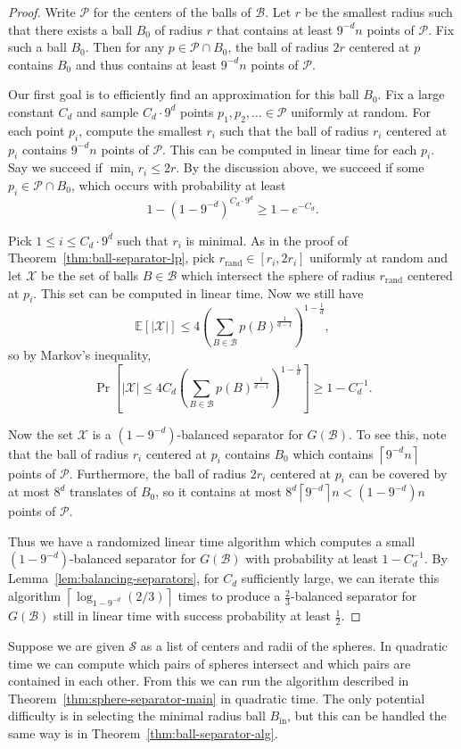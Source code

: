 \documentclass[11pt, reqno]{amsart}
\theoremstyle{plain}
\theoremstyle{definition}
\theoremstyle{remark}
\numberwithin{theorem}{section}
\numberwithin{equation}{section}
\newcommand{\ceil}[1]{\left\lceil #1 \right\rceil}
\newcommand{\paren}[1]{\left( #1 \right)}
\newcommand{\sqb}[1]{\left[ #1 \right]}
\newcommand{\E}{\mathbb E}
\newcommand{\fB}{\mathcal B}
\newcommand{\fS}{\mathcal S}
\newcommand{\fX}{\mathcal X}
\newcommand{\cP}{\mathcal P}
\begin{document}
\begin{proof}
Write $\cP$ for the centers of the balls of $\fB$. Let $r$ be the smallest radius such that there exists a ball $B_0$ of radius $r$ that contains at least $9^{-d}n$ points of $\cP$. Fix such a ball $B_0$. Then for any $p\in \cP\cap B_0$, the ball of radius $2r$ centered at $p$ contains $B_0$ and thus contains at least $9^{-d}n$ points of $\cP$.

Our first goal is to efficiently find an approximation for this ball $B_0$. Fix a large constant $C_d$ and sample $C_d\cdot 9^{d}$ points $p_1,p_2,\ldots\in\cP$ uniformly at random. For each point $p_i$, compute the smallest $r_i$ such that the ball of radius $r_i$ centered at $p_i$ contains $9^{-d}n$ points of $\cP$. This can be computed in linear time for each $p_i$. Say we succeed if $\min_i r_i\leq 2r$. By the discussion above, we succeed if some $p_i\in\cP\cap B_0$, which occurs with probability at least
\[1-\paren{1-9^{-d}}^{C_d\cdot 9^d}\geq 1-e^{-C_d}.\]

Pick $1\leq i\leq C_d\cdot9^d$ such that $r_i$ is minimal. As in the proof of Theorem~\ref{thm:ball-separator-lp}, pick $r_{\mathrm{rand}}\in[r_i,2r_i]$ uniformly at random and let $\fX$ be the set of balls $B\in\fB$ which intersect the sphere of radius $r_{\mathrm{rand}}$ centered at $p_i$. This set can be computed in linear time. Now we still have \[\E[|\fX|]\leq 4\paren{\sum_{B\in\fB}p(B)^{\tfrac1{d-1}}}^{1-\tfrac1d},\]
so by Markov's inequality,
\[\Pr\sqb{|\fX|\leq 4C_d\paren{\sum_{B\in\fB}p(B)^{\tfrac1{d-1}}}^{1-\tfrac1d}}\geq 1-C_d^{-1}.\]

Now the set $\fX$ is a $(1-9^{-d})$-balanced separator for $G(\fB)$. To see this, note that the ball of radius $r_i$ centered at $p_i$ contains $B_0$ which contains $\ceil{9^{-d}n}$ points of $\cP$. Furthermore, the ball of radius $2r_i$ centered at $p_i$ can be covered by at most $8^d$ translates of $B_0$, so it contains at most $8^d\ceil{9^{-d}}n<(1-9^{-d})n$ points of $\cP$.

Thus we have a randomized linear time algorithm which computes a small $(1-9^{-d})$-balanced separator for $G(\fB)$ with probability at least $1-C_d^{-1}$. By Lemma~\ref{lem:balancing-separators}, for $C_d$ sufficiently large, we can iterate this algorithm $\ceil{\log_{1-9^{-d}}(2/3)}$ times to produce a $\tfrac23$-balanced separator for $G(\fB)$ still in linear time with success probability at least $\tfrac12$.
\end{proof}

Suppose we are given $\fS$ as a list of centers and radii of the spheres. In quadratic time we can compute which pairs of spheres intersect and which pairs are contained in each other. From this we can run the algorithm described in Theorem~\ref{thm:sphere-separator-main} in quadratic time. The only potential difficulty is in selecting the minimal radius ball $B_{\mathrm{in}}$, but this can be handled the same way is in Theorem~\ref{thm:ball-separator-alg}.
\end{document}
